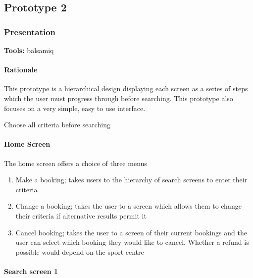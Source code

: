 \subsection{Prototype 2}

\subsubsection{Presentation}
\textbf{Tools:} balsamiq

\paragraph{Rationale}
This prototype is a hierarchical design displaying each screen as a series of
steps which the user must progress through before searching. This prototype
also focuses on a very simple, easy to use interface.

Choose all criteria before searching

\paragraph{Home Screen}

The home screen offers a choice of three menus

\begin{enumerate}
	\item Make a booking; takes users to the hierarchy of search screens to
		enter their criteria
	\item Change a booking; takes the user to a screen which allows them to
		change their criteria if alternative results permit it
	\item Cancel booking; takes the user to a screen of their current bookings
		and the user can select which booking they would like to cancel.
		Whether a refund is possible would depend on the sport centre
\end{enumerate}

\paragraph{Search screen 1}

